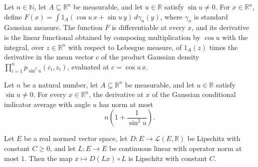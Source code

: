 \begin{lemma}
\leanok
{}
Let $n\in\mathbb N$, let $A\subseteq\mathbb R^n$ be measurable, and let $u\in\mathbb R$
satisfy $\sin u\ne0$. For $x\in\mathbb R^n$, define $F(x)=\int 1_A(\cos u\,x+\sin
u\,y)\,d\gamma_n(y)$, where $\gamma_n$ is standard Gaussian measure. The function $F$ is
differentiable at every $x$, and its derivative is the linear functional obtained by
composing multiplication by $\cos u$ with the integral, over $z\in\mathbb R^n$ with
respect to Lebesgue measure, of $1_A(z)$ times the derivative in the mean vector $c$ of
the product Gaussian density $\prod_{i=1}^n p_{\sin^2u}(c_i,z_i)$, evaluated at $c=\cos
u\,x$.
\end{lemma}

\begin{lemma}
\leanok
{}
Let $n$ be a natural number, let $A\subseteq\mathbb R^n$ be measurable, and let
$u\in\mathbb R$ satisfy $\sin u\ne0$. For every $x\in\mathbb R^n$, the derivative at $x$
of the Gaussian conditional indicator average with angle $u$ has norm at most
\[
n\left(1+\frac{1}{\sin^2 u}\right).
\]
\end{lemma}

\begin{lemma}
\leanok
{}
Let $E$ be a real normed vector space, let $D:E\to\mathcal L(E,\mathbb R)$ be Lipschitz
with constant $C\ge0$, and let $L:E\to E$ be continuous linear with operator norm at
most $1$. Then the map $x\mapsto D(Lx)\circ L$ is Lipschitz with constant $C$.
\end{lemma}

